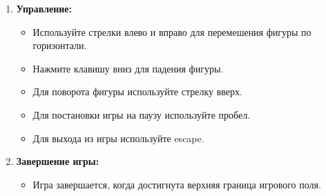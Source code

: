 \documentclass{article}
\begin{document}
\begin{enumerate}
    \item \textbf{Управление:}
        \begin{itemize}
            \item Используйте стрелки влево и вправо для перемешения фигуры по горизонтали.
            \item Нажмите клавишу вниз для падения фигуры.
            \item Для поворота фигуры используйте стрелку вверх.
            \item Для постановки игры на паузу используйте пробел.
            \item Для выхода из игры используйте escape.
        \end{itemize}
    \item \textbf{Завершение игры:}
        \begin{itemize}
            \item Игра завершается, когда достигнута верхняя граница игрового поля.
        \end{itemize}
\end{enumerate}
\end{document}
